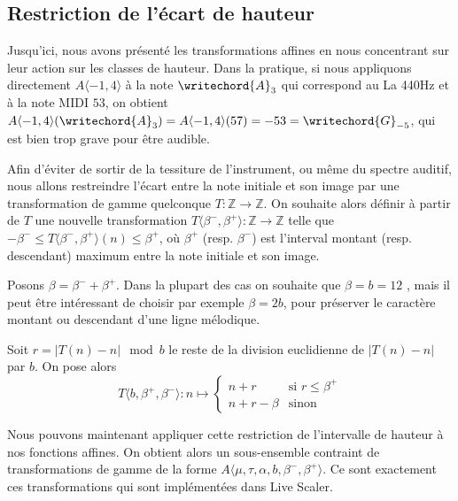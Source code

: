 \subsection{Restriction de l'écart de hauteur}
Jusqu'ici, nous avons présenté les transformations affines en nous concentrant sur leur action sur les classes de hauteur. Dans la pratique, si nous appliquons directement $A\langle -1,4 \rangle$ à la note  $\writechord{A}_3$ qui correspond au La 440Hz et à la note MIDI $53$, on obtient $A\langle -1,4 \rangle(\writechord{A}_3) = A\langle -1,4 \rangle(57) = -53 = \writechord{G}_{-5}$, qui est bien trop grave pour être audible. 

Afin d'éviter de sortir de la tessiture de l'instrument, ou même du spectre auditif, nous allons restreindre l'écart entre la note initiale et son image par une transformation de gamme quelconque $T : \mathbb{Z}\rightarrow \mathbb{Z}$. On souhaite alors définir à partir de $T$ une nouvelle transformation $T\langle \beta^-, \beta^+\rangle : \mathbb{Z}\rightarrow \mathbb{Z}$ telle que $ - \beta^- \leq T\langle \beta^-, \beta^+\rangle(n) \leq \beta ^+$, où $\beta^+$ (resp. $\beta^-$) est l'interval montant (resp. descendant) maximum entre la note initiale et son image.

Posons $\beta = \beta^- + \beta^+$.  Dans la plupart des cas on souhaite que $\beta = b = 12$ , mais il peut être intéressant de choisir par exemple $\beta  = 2b$, pour préserver le caractère montant ou descendant d'une ligne mélodique.

Soit $r = |T(n) - n | \mod b$ le reste de la division euclidienne de  $|T(n) - n |$ par $b$. On pose alors 
$$
T\langle b, \beta^+, \beta^- \rangle : n \mapsto \begin{cases}
  n + r & \text{si $r \leq \beta^+$}\\
  n + r - \beta & \text{sinon}
\end{cases}
$$

Nous pouvons maintenant appliquer cette restriction de l'intervalle de hauteur à nos fonctions affines. On obtient alors un sous-ensemble contraint de transformations de gamme de la forme $A\langle \mu, \tau, \alpha, b, \beta^-, \beta^+\rangle$. Ce sont exactement ces transformations qui sont implémentées dans Live Scaler.
  

